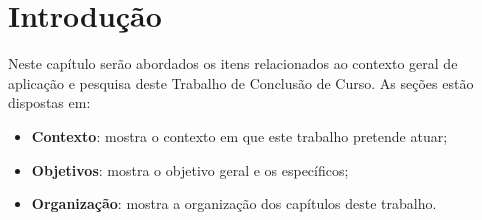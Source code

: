 \newpage\null\thispagestyle{empty}\newpage
\chapter{Introdução}
\label{chap:intro}

Neste capítulo serão abordados os itens relacionados ao contexto geral de
aplicação e pesquisa deste Trabalho de Conclusão de Curso. As seções estão
dispostas em:

\begin{itemize}
  \item \textbf{Contexto}: mostra o contexto em que este trabalho pretende
    atuar;
  \item \textbf{Objetivos}: mostra o objetivo geral e os específicos;
  \item \textbf{Organização}: mostra a organização dos capítulos deste
    trabalho.
\end{itemize}





